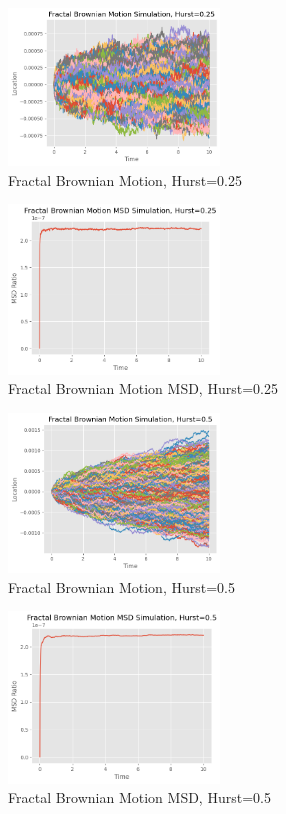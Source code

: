 \documentclass{article}
\begin{document}
\begin{enumerate}
\begin{figure}[h]
\caption{Fractal Brownian Motion, Hurst=0.25}
\centering
\includegraphics[width=0.5\textwidth]{fractal_brownian_motion_simulation_0.25.png}
\end{figure}
\begin{figure}[h]
\caption{Fractal Brownian Motion MSD, Hurst=0.25}
\centering
\includegraphics[width=0.5\textwidth]{fbm_msd_0.25.png}
\end{figure}
\begin{figure}[h]
\caption{Fractal Brownian Motion, Hurst=0.5}
\centering
\includegraphics[width=0.5\textwidth]{fractal_brownian_motion_simulation_0.5.png}
\end{figure}
\begin{figure}[h]
\caption{Fractal Brownian Motion MSD, Hurst=0.5}
\centering
\includegraphics[width=0.5\textwidth]{fbm_msd_0.5.png}

\end{figure}
\end{enumerate}
\end{document}

